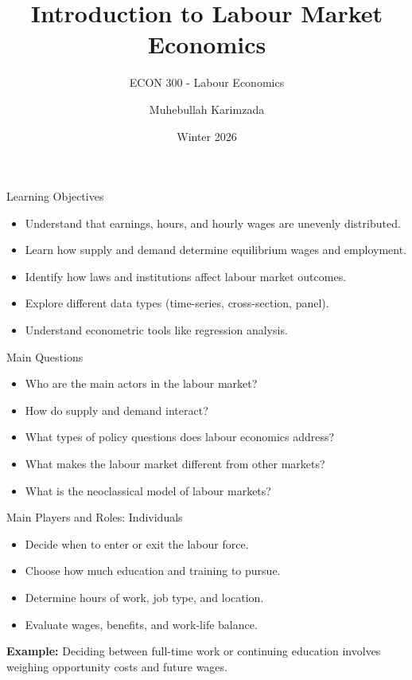 \documentclass[aspectratio=169]{beamer}
\title{\textbf{Introduction to Labour Market Economics \vspace{.5cm}\\  }}
\subtitle{ {\large ECON 300 - Labour Economics}}
\author{Muhebullah Karimzada}
\date{Winter 2026}
\begin{document}
\begin{frame}[plain]
  \titlepage
\end{frame}

\begin{frame}{Learning Objectives}
\begin{itemize}[<+->]
  \item Understand that earnings, hours, and hourly wages are unevenly distributed.
  \item Learn how supply and demand determine equilibrium wages and employment.
  \item Identify how laws and institutions affect labour market outcomes.
  \item Explore different data types (time-series, cross-section, panel).
  \item Understand econometric tools like regression analysis.
\end{itemize}
\end{frame}

\begin{frame}{Main Questions}
\begin{itemize}[<+->]
  \item Who are the main actors in the labour market?
  \item How do supply and demand interact?
  \item What types of policy questions does labour economics address?
  \item What makes the labour market different from other markets?
  \item What is the neoclassical model of labour markets?
\end{itemize}
\end{frame}

\begin{frame}{Main Players and Roles: Individuals}
\begin{itemize}[<+->]
  \item Decide when to enter or exit the labour force.
  \item Choose how much education and training to pursue.
  \item Determine hours of work, job type, and location.
  \item Evaluate wages, benefits, and work-life balance.
\end{itemize}
\textbf{Example:} Deciding between full-time work or continuing education involves weighing opportunity costs and future wages.
\end{frame}
\end{document}
